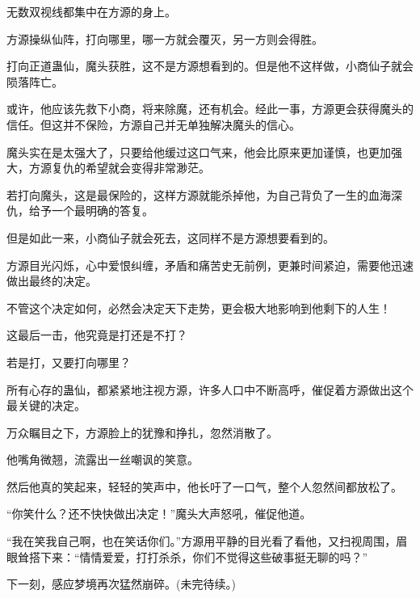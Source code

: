 \begin{this_body}
无数双视线都集中在方源的身上。

方源操纵仙阵，打向哪里，哪一方就会覆灭，另一方则会得胜。

打向正道蛊仙，魔头获胜，这不是方源想看到的。但是他不这样做，小商仙子就会陨落阵亡。

或许，他应该先救下小商，将来除魔，还有机会。经此一事，方源更会获得魔头的信任。但这并不保险，方源自己并无单独解决魔头的信心。

魔头实在是太强大了，只要给他缓过这口气来，他会比原来更加谨慎，也更加强大，方源复仇的希望就会变得非常渺茫。

若打向魔头，这是最保险的，这样方源就能杀掉他，为自己背负了一生的血海深仇，给予一个最明确的答复。

但是如此一来，小商仙子就会死去，这同样不是方源想要看到的。

方源目光闪烁，心中爱恨纠缠，矛盾和痛苦史无前例，更兼时间紧迫，需要他迅速做出最终的决定。

不管这个决定如何，必然会决定天下走势，更会极大地影响到他剩下的人生！

这最后一击，他究竟是打还是不打？

若是打，又要打向哪里？

所有心存的蛊仙，都紧紧地注视方源，许多人口中不断高呼，催促着方源做出这个最关键的决定。

万众瞩目之下，方源脸上的犹豫和挣扎，忽然消散了。

他嘴角微翘，流露出一丝嘲讽的笑意。

然后他真的笑起来，轻轻的笑声中，他长吁了一口气，整个人忽然间都放松了。

“你笑什么？还不快快做出决定！”魔头大声怒吼，催促他道。

“我在笑我自己啊，也在笑话你们。”方源用平静的目光看了看他，又扫视周围，眉眼耸搭下来：“情情爱爱，打打杀杀，你们不觉得这些破事挺无聊的吗？”

下一刻，感应梦境再次猛然崩碎。(未完待续。)

\end{this_body}

